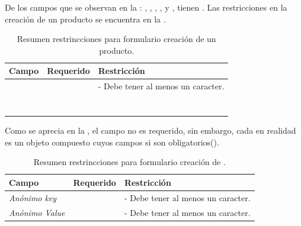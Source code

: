 		De los campos que se observan en la : \titleForm, \pageTitleForm, \vendorForm, \descriptionForm, \tagsForm y \detailsForm, tienen \feedbackReactivoDEF. Las restricciones en la creación de un producto se encuentra en la . 

		\begin{table}[H]
		    \centering
			\begin{tabular}{ |l|c||l| }
				\hline Campo & Requerido & Restricción \\ \hline
				\multirow{1}{*}{\titleForm} 			&  \multirow{1}{*}{\checkmark} & - Debe tener al menos un caracter. \\ \hline
				\multirow{1}{*}{\pageTitleForm} 	&  \multirow{1}{*}{} &  \\ \hline
				\multirow{1}{*}{\vendorForm}		&  \multirow{1}{*}{} &  \\ \hline
				\multirow{1}{*}{\optionsForm}		&  \multirow{1}{*}{\checkmark} &  \\ \hline
				\multirow{1}{*}{\descriptionForm}	&  \multirow{1}{*}{} &  \\ \hline
				\multirow{1}{*}{\multimediaForm}	&  \multirow{1}{*}{} &  \\ \hline
				\multirow{1}{*}{\tagsForm}			&  \multirow{1}{*}{} &  \\ \hline
				\multirow{1}{*}{\detailsForm}		&  \multirow{1}{*}{} &  \\ \hline
			\end{tabular}
		 	\caption{Resumen restrincciones para formulario creación de un producto.}
		    \label{tab:solution:products:create:form:product:generic}
		\end{table}

		Como se aprecia en la , el campo \detailsForm no es requerido, sin embargo, cada \detailForm en realidad es un objeto compuesto cuyos campos si son obligatorios().
		\begin{table}[H]
		    \centering
			\begin{tabular}{ |l|c||l| }
				\hline Campo & Requerido & Restricción \\ \hline
				\multirow{1}{*}{\textit{Anónimo key}}	&  \multirow{1}{*}{\checkmark} & - Debe tener al menos un caracter. \\ \hline
				\multirow{1}{*}{\textit{Anónimo Value}}	&  \multirow{1}{*}{\checkmark} & - Debe tener al menos un caracter. \\ \hline
			\end{tabular}
		 	\caption{Resumen restrincciones para formulario creación de \detailsForm.}
		    \label{tab:solution:products:create:form:product:generic:details}
		\end{table}

